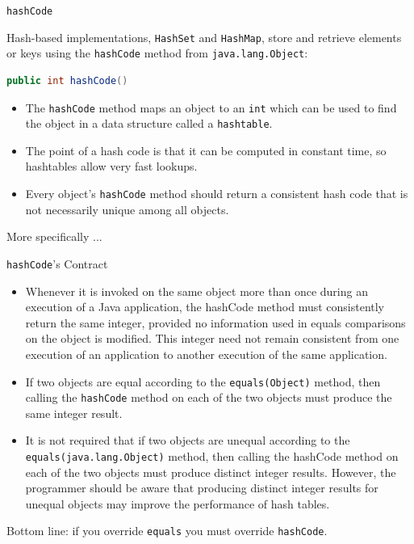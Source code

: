 \documentclass{beamer}
\begin{document}
\begin{frame}[fragile]{{\tt hashCode}}

Hash-based implementations, {\tt HashSet} and {\tt HashMap}, store and retrieve elements or keys using the {\tt hashCode} method from {\tt java.lang.Object}:

\begin{lstlisting}[language=Java]
public int hashCode()
\end{lstlisting}
\begin{itemize}
\item The {\tt hashCode} method maps an object to an {\tt int} which can be used to find the object in a data structure called a {\tt hashtable}.
\item The point of a hash code is that it can be computed in constant time, so hashtables allow very fast lookups.
\item Every object's {\tt hashCode} method should return a consistent hash code that  is not necessarily unique among all objects.
\end{itemize}

More specifically ...

\end{frame}

\begin{frame}[fragile]{{\tt hashCode}'s Contract}
\vspace{-.12in}
\begin{itemize}
\item Whenever it is invoked on the same object more than once during an execution of a Java application, the hashCode method must consistently return the same integer, provided no information used in equals comparisons on the object is modified. This integer need not remain consistent from one execution of an application to another execution of the same application.
\item If two objects are equal according to the {\tt equals(Object)} method, then calling the {\tt hashCode} method on each of the two objects must produce the same integer result.
\item It is not required that if two objects are unequal according to the {\tt equals(java.lang.Object)} method, then calling the hashCode method on each of the two objects must produce distinct integer results. However, the programmer should be aware that producing distinct integer results for unequal objects may improve the performance of hash tables.
\end{itemize}
\vspace{-.05in}
Bottom line: if you override {\tt equals} you must override {\tt hashCode}.\\

\end{frame}
\end{document}
